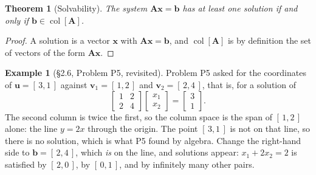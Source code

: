 \documentclass[11pt]{article}
\theoremstyle{plain}
\newtheorem{thm}{Theorem}[section]
\theoremstyle{definition}
\newtheorem{ex}{Example}[section]
\theoremstyle{remark}
\newcommand{\vc}[1]{\mathbf{#1}}        %
\newcommand{\mt}[1]{\mathbf{#1}}        %
\newcommand{\colsp}[1]{\operatorname{col}[#1]}
\begin{document}
\begin{thm}[Solvability]
The system $\mt{A}\vc{x}=\vc{b}$ has at least one solution if and only if
$\vc{b}\in\colsp{\mt{A}}$.
\end{thm}

\begin{proof}
A solution is a vector $\vc{x}$ with $\mt{A}\vc{x}=\vc{b}$, and
$\colsp{\mt{A}}$ is by definition the set of vectors of the form
$\mt{A}\vc{x}$.
\end{proof}

\begin{ex}[\S2.6, Problem P5, revisited]
\label{ex:p5}
Problem P5 asked for the coordinates of $\vc{u}=[\,3,1\,]$ against
$\vc{v}_1=[\,1,2\,]$ and $\vc{v}_2=[\,2,4\,]$, that is, for a solution of
\[
  \begin{bmatrix} 1 & 2 \\ 2 & 4 \end{bmatrix}
  \begin{bmatrix} x_1 \\ x_2 \end{bmatrix}
  =
  \begin{bmatrix} 3 \\ 1 \end{bmatrix} .
\]
The second column is twice the first, so the column space is the span of
$[\,1,2\,]$ alone: the line $y=2x$ through the origin. The point $[\,3,1\,]$ is
not on that line, so there is no solution, which is what P5 found by algebra.
Change the right-hand side to $\vc{b}=[\,2,4\,]$, which \emph{is} on the line,
and solutions appear: $x_1+2x_2=2$ is satisfied by $[\,2,0\,]$, by
$[\,0,1\,]$, and by infinitely many other pairs.
\end{ex}

\begin{center}
\end{center}
\end{document}
